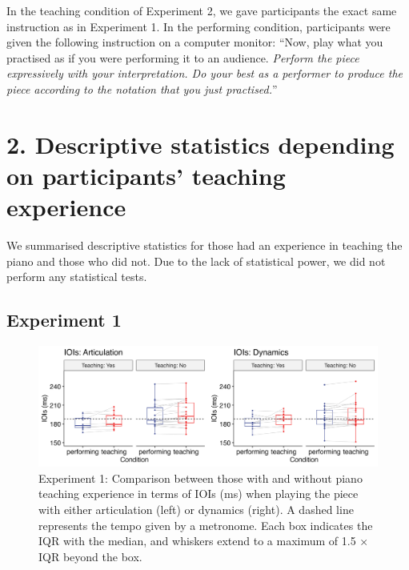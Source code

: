 \documentclass[
  man,floatsintext]{apa6}
\begin{document}
In the teaching condition of Experiment 2, we gave participants the exact same instruction as in Experiment 1. In the performing condition, participants were given the following instruction on a computer monitor: ``Now, play what you practised as if you were performing it to an audience. \emph{Perform the piece expressively with your interpretation. Do your best as a performer to produce the piece according to the notation that you just practised.}''

\clearpage

\hypertarget{descriptive-statistics-depending-on-participants-teaching-experience}{%
\section{2. Descriptive statistics depending on participants' teaching experience}\label{descriptive-statistics-depending-on-participants-teaching-experience}}

We summarised descriptive statistics for those had an experience in teaching the piano and those who did not. Due to the lack of statistical power, we did not perform any statistical tests.

\hypertarget{experiment-1-2}{%
\subsection{Experiment 1}\label{experiment-1-2}}

\begin{figure}
\includegraphics[width=1\linewidth]{manuscript_files/figure-latex/plot-ioi-teaching-1-1} \caption{\label{fig:ioi-teaching-1}Experiment 1: Comparison between those with and without piano teaching experience in terms of IOIs (ms) when playing the piece with either articulation (left) or dynamics (right). A dashed line represents the tempo given by a metronome. Each box indicates the IQR with the median, and whiskers extend to a maximum of 1.5 × IQR beyond the box.}\label{fig:plot-ioi-teaching-1}
\end{figure}
\end{document}

